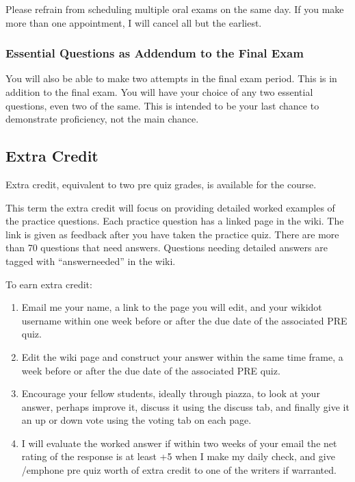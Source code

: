 \documentclass[letterpaper,10pt]{article}
\newif\ifonline
\begin{document}
  Please refrain from scheduling multiple oral exams on the same day.  If you make more than one appointment, I will cancel all but the earliest.
  
  \subsubsection{ Essential Questions as Addendum to the Final Exam}
  You will also be able to make two attempts in the final exam period. This is in addition to the final exam. You will have your choice of any two essential questions, even two of the same. This is intended to be your last chance to demonstrate proficiency, not the main chance.

\fi

\ifonline

\else
\subsection{Extra Credit}\label{sec:ExtraCredit}
Extra credit, equivalent to two pre quiz grades, is available for the
course.  

This term the extra credit will focus on providing detailed worked examples of the practice questions.  Each practice question has a linked page in the wiki.  The link is given as feedback after you have taken the practice quiz.  There are more than 70 questions that need answers.  Questions needing detailed answers are tagged with ``answerneeded'' in the wiki.

To earn extra credit:
\begin{enumerate}
    
    \item Email me your name, a link to the page you will edit, and your wikidot username within one week before or after the due date of the associated PRE quiz. 
    
    \item Edit the wiki page and construct your answer within the same time frame, a week before or after the due date of the associated PRE quiz.
    
    \item Encourage your fellow students, ideally through piazza, to look at your answer, perhaps improve it, discuss it using the discuss tab, and finally give it an up or down vote using the voting tab on each page.  
    
    \item I will evaluate the worked answer if within two weeks of your email the net rating of the response is at least +5 when I make my daily check, and give /emph{one pre quiz worth of extra credit} to one of the writers if warranted.

\end{enumerate}
\end{document}
